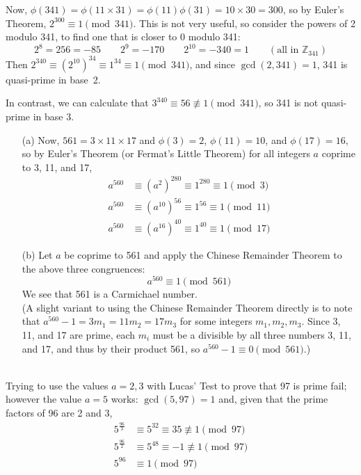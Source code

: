 \documentclass[11pt]{article}
\begin{document}
\bigskip{}
Now, $\phi(341) = \phi(11\times 31) = \phi(11)\phi(31) = 10\times 30 = 300$,
so by Euler's Theorem, $2^{300}\equiv 1\pmod{341}$.
This is not very useful, so consider the powers of 2 modulo 341,
to find one that is closer to 0 modulo 341:
\[
  2^8 = 256 = -85 \qquad
  2^9 = -170 \qquad
  2^{10} = -340 = 1\qquad
  (\text{all in $\mathbb{Z}_{341}$})
\]
Then $2^{340} \equiv (2^{10})^{34}\equiv 1^{34} \equiv 1\pmod{341}$,
and since $\gcd(2,341) = 1$,
341 is quasi-prime in base~2.

In contrast, we can calculate that $3^{340} \equiv 56\not\equiv1\pmod{341}$,
so 341 is not quasi-prime in base 3.


\bigskip{}
\begin{itemize}
  \item[{(a)}] Now, $561 = 3\times 11\times 17$ and $\phi(3) = 2$, $\phi(11) = 10$, and $\phi(17) = 16$,
    so by Euler's Theorem (or Fermat's Little Theorem) for all integers $a$ coprime to 3, 11, and 17,
    \begin{align*}
      a^{560} &\equiv (a^2)^{280}   \equiv 1^{280} \equiv 1\pmod{3}\\
      a^{560} &\equiv (a^{10})^{56} \equiv 1^{56}  \equiv 1\pmod{11}\\
      a^{560} &\equiv (a^{16})^{40} \equiv 1^{40}  \equiv 1\pmod{17}
    \end{align*}
  \item[{(b)}] Let $a$ be coprime to 561 and apply the Chinese Remainder Theorem to the above three congruences:
      \[
        a^{560} \equiv 1\pmod{561}
      \]
      We see that 561 is a Carmichael number.\\
      (A slight variant to using the Chinese Remainder Theorem directly
       is to note that $a^{560} - 1 = 3m_1 = 11m_2 = 17m_3$ for some integers $m_1,m_2,m_3$.
       Since 3, 11, and 17 are prime, each $m_i$ must be a divisible by all three numbers 3, 11, and 17,
       and thus by their product 561, so $a^{560} -1 \equiv 0\pmod {561}$.)
\end{itemize}


\bigskip{}\\
Trying to use the values $a = 2,3$ with Lucas' Test to prove that 97 is prime fail;\\
however the value $a = 5$ works: $\gcd(5,97) = 1$ and,
given that the prime factors of 96 are 2 and 3,
\begin{align*}
  5^{\frac{96}{3}} &\equiv 5^{32} \equiv 35\not\equiv 1\pmod{97}\\
  5^{\frac{96}{2}} &\equiv 5^{48} \equiv -1\not\equiv 1\pmod{97}\\
  5^{96}           &\equiv 1\pmod{97}
\end{align*}
\end{document}
